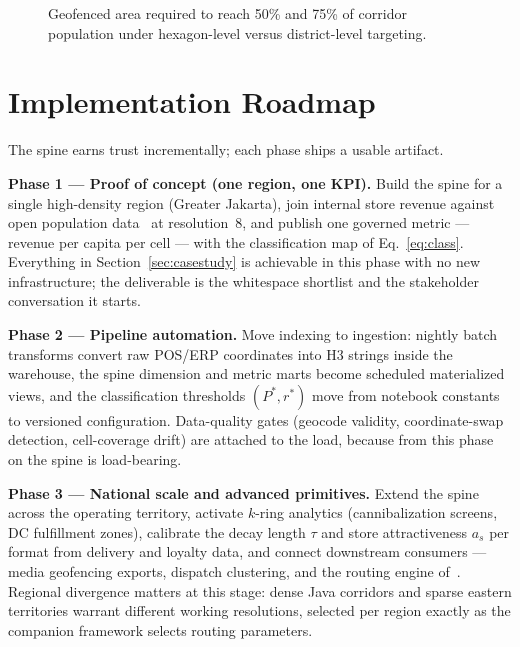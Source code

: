 \documentclass[11pt,a4paper,twocolumn]{article}
\begin{document}
\begin{figure}[!tp]
  \centering
  \resizebox{0.94\columnwidth}{!}{}
  \caption{Geofenced area required to reach 50\% and 75\% of corridor
    population under hexagon-level versus district-level targeting.}
  \label{fig:bars}
\end{figure}

\section{Implementation Roadmap}
\label{sec:roadmap}

The spine earns trust incrementally; each phase ships a usable artifact.

\textbf{Phase 1 --- Proof of concept (one region, one KPI).} Build the
spine for a single high-density region (Greater Jakarta), join internal
store revenue against open population data~\cite{kontur} at resolution~8,
and publish one governed metric --- revenue per capita per cell --- with
the classification map of Eq.~\eqref{eq:class}. Everything in
Section~\ref{sec:casestudy} is achievable in this phase with no new
infrastructure; the deliverable is the whitespace shortlist and the
stakeholder conversation it starts.

\textbf{Phase 2 --- Pipeline automation.} Move indexing to ingestion:
nightly batch transforms convert raw POS/ERP coordinates into H3 strings
inside the warehouse, the spine dimension and metric marts become
scheduled materialized views, and the classification thresholds
$(P^{*}, r^{*})$ move from notebook constants to versioned configuration.
Data-quality gates (geocode validity, coordinate-swap detection,
cell-coverage drift) are attached to the load, because from this phase on
the spine is load-bearing.

\textbf{Phase 3 --- National scale and advanced primitives.} Extend the
spine across the operating territory, activate $k$-ring analytics
(cannibalization screens, DC fulfillment zones), calibrate the decay
length $\tau$ and store attractiveness $a_s$ per format from delivery and
loyalty data, and connect downstream consumers --- media geofencing
exports, dispatch clustering, and the routing engine
of~\cite{terra2026}. Regional divergence matters at this stage: dense
Java corridors and sparse eastern territories warrant different working
resolutions, selected per region exactly as the companion framework
selects routing parameters.
\end{document}
